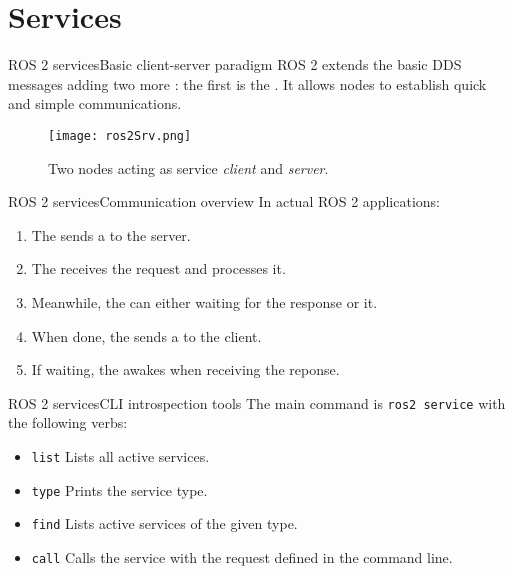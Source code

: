 
\section{Services}
\graphicspath{{figs/section2/}}

\begin{frame}{ROS 2 services}{Basic client-server paradigm}
  ROS 2 extends the basic DDS messages adding two more : the first is the . It allows nodes to establish quick and simple  communications.
  \begin{figure}
    \centering
    \texttt{[image: ros2Srv.png]}
    \caption{Two nodes acting as service \emph{client} and \emph{server}.}
    \label{fig:ros2srv}
  \end{figure}
\end{frame}
\begin{frame}{ROS 2 services}{Communication overview}
  In actual ROS 2 applications:
  \begin{enumerate}
    \item The  sends a  to the server.
    \item The  receives the request and processes it.
    \item Meanwhile, the  can either  waiting for the response or  it.
    \item When done, the  sends a  to the client.
    \item If waiting, the  awakes when receiving the reponse.
  \end{enumerate}
\end{frame}
\begin{frame}{ROS 2 services}{CLI introspection tools}
  The main command is \texttt{ros2 service} with the following verbs:
  \begin{itemize}
    \item \texttt{list} Lists all active services.
    \item \texttt{type} Prints the service type.
    \item \texttt{find} Lists active services of the given type.
    \item \texttt{call} Calls the service with the request defined in the command line.
  \end{itemize}
\end{frame}
